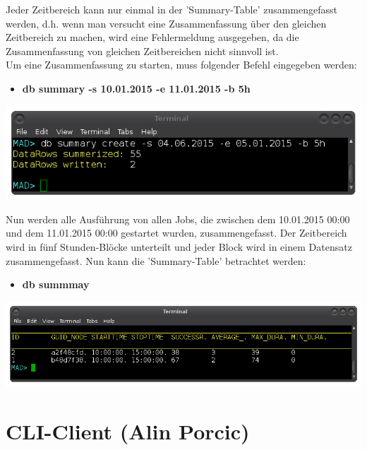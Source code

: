 \documentclass[12pt,a4paper]{report}
\begin{document}
\begin{onehalfspace}
Jeder Zeitbereich kann nur einmal in der 'Summary-Table' zusammengefasst werden, d.h. wenn man versucht eine Zusammenfassung über den gleichen Zeitbereich zu machen, wird eine Fehlermeldung ausgegeben, da die Zusammenfassung von gleichen Zeitbereichen nicht sinnvoll ist.\\

Um eine Zusammenfassung zu starten, muss folgender Befehl eingegeben werden:

\begin{itemize}
\item \textbf{db summary -s 10.01.2015 -e 11.01.2015 -b 5h}
\end{itemize}

\begin{center}
\includegraphics[scale=0.5]{img/db_summary_create.png}
\end{center}

Nun werden alle Ausführung von allen Jobs, die zwischen dem 10.01.2015 00:00 und dem 11.01.2015 00:00 gestartet wurden, zusammengefasst. Der Zeitbereich wird in fünf Stunden-Blöcke unterteilt und jeder Block wird in einem Datensatz zusammengefasst. Nun kann die 'Summary-Table' betrachtet werden:\\

\begin{itemize}
\item \textbf{db summmay}
\end{itemize}

\begin{center}
\includegraphics[scale=0.5]{img/db_summary.png}
\end{center}

\chapter{CLI-Client (Alin Porcic)}


\end{onehalfspace}
\end{document}
